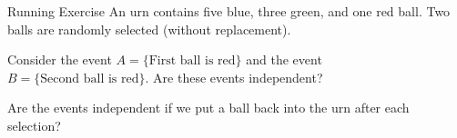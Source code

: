 \documentclass[11pt,compress,t,notes=noshow, xcolor=table]{beamer}
\begin{document}
\begin{vbframe}{Running Exercise}  
	An urn contains five blue, three green, and one red ball. Two balls are randomly selected (without replacement).
	
	\lz
	
	
	
	Consider the event $A=\{\mbox{First ball is red}\}$ and the event $B=\{\mbox{Second ball is red}\}.$ 
	Are these events independent?
	
	
	\lz
	
	\lz
	\lz
	\lz
	
	Are the events independent if we put a ball back into the urn after each selection?
	
	
	
\end{vbframe}
\end{document}
